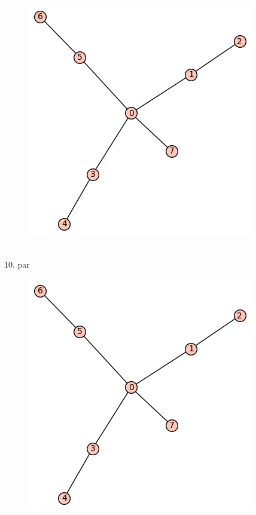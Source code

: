\documentclass[12pt, a4paper]{article}
\begin{document}
\begin{figure}[h!]
\centering
\includegraphics[width=\linewidth]{t-44}
\end{figure} \\

10. par

\begin{figure}[h!]
\centering
\includegraphics[width=\linewidth]{t-44}
\end{figure} \\
\end{document}
